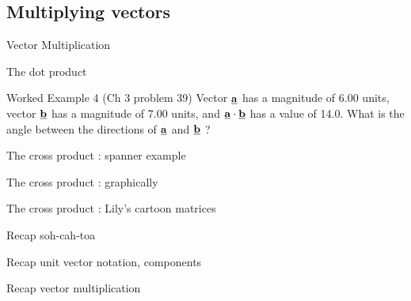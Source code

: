  \subsection{Multiplying vectors} %
 
 
\begin{frame}{Vector Multiplication}
\small

\end{frame}



  \begin{frame}{The dot product}
\small

\end{frame}


  \begin{frame}{Worked Example 4 (Ch 3 problem 39) }
\small
Vector $\underline{\mathbf{a}}$ has a magnitude of 6.00 units, vector $\underline{\mathbf{b}}$ has a magnitude of 7.00 units, and $\underline{\mathbf{a}} \cdot\underline{\mathbf{b}} $ has a value of 14.0. What is the angle between the directions of $\underline{\mathbf{a}}$ and $\underline{\mathbf{b}} $ ?\\[20ex]


\end{frame}

  \begin{frame}{The cross product : spanner example}
\small

\end{frame}

  \begin{frame}{The cross product : graphically }
\small

\end{frame}

  \begin{frame}{The cross product : Lily's cartoon matrices }
\small

\end{frame}


  \begin{frame}{Recap soh-cah-toa}
\small

\end{frame}



  \begin{frame}{Recap unit vector notation, components}
\small

\end{frame}

  \begin{frame}{Recap vector multiplication}
\small

\end{frame}

